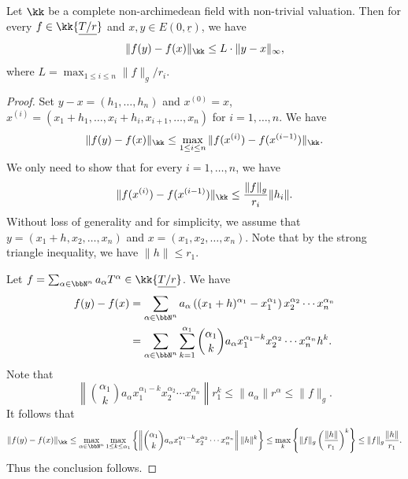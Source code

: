         \begin{proposition}\label{prop:analytic_function_is_lipschitz}
        Let \(\kk\) be a complete non-archimedean field with non-trivial valuation.
        Then for every \(f \in \kk\{ \underline{T/r} \} \) and \(x,y \in E(0,\underline{r})\), we have
        \[ \|f(y) - f(x)\|_\kk \leq L \cdot \|y - x\|_{\infty}, \]
        where \(L = \max_{1 \leq i \leq n} \|f\|_g/r_i\).
    \end{proposition}
    \begin{proof}
        Set \(y - x = (h_1, \ldots, h_n)\) and \(x^{(0)} = x\), \(x^{(i)} = (x_1 + h_1, \ldots, x_i + h_i, x_{i+1}, \ldots, x_n)\) for \(i = 1, \ldots, n\).
        We have
        \[ \|f(y) - f(x)\|_\kk \leq \max_{1 \leq i \leq n} \|f(x^{(i)}) - f(x^{(i-1)})\|_\kk. \]
        We only need to show that for every \(i = 1, \ldots, n\), we have
        \[ \|f(x^{(i)}) - f(x^{(i-1)})\|_\kk \leq \frac{\|f\|_g}{r_i} \|h_i\|. \]
        Without loss of generality and for simplicity, we assume that \(y = (x_1 + h, x_2, \ldots, x_n)\) and \(x = (x_1, x_2, \ldots, x_n)\).
        Note that by the strong triangle inequality, we have \(\|h\| \leq r_1\).

        Let \(f = \sum_{\alpha \in \bbN^n} a_\alpha T^\alpha \in \kk\{ \underline{T/r} \} \).
        We have
        \begin{align*}
            f(y) - f(x) &= \sum_{\alpha \in \bbN^n} a_\alpha \left( (x_1 + h)^{\alpha_1} - x_1^{\alpha_1} \right) x_2^{\alpha_2} \cdots x_n^{\alpha_n} \\
            &= \sum_{\alpha \in \bbN^n}\sum_{k=1}^{\alpha_1} \binom{\alpha_1}{k} a_\alpha x_1^{\alpha_1 - k} x_2^{\alpha_2} \cdots x_n^{\alpha_n}h^k.
        \end{align*}
        Note that
        \[ \left\|\binom{\alpha_1}{k} a_\alpha x_1^{\alpha_1 - k} x_2^{\alpha_2} \cdots x_n^{\alpha_n} \right\| r_1^{k} \leq \|a_\alpha\| r^\alpha \leq \|f\|_g. \]
        It follows that
        \[ \|f(y) - f(x)\|_\kk \leq \max_{\alpha \in \bbN^n} \max_{1 \leq k \leq \alpha_1} \left\{ \left\|\binom{\alpha_1}{k} a_\alpha x_1^{\alpha_1 - k} x_2^{\alpha_2} \cdots x_n^{\alpha_n} \right\| \|h\|^k \right\} \leq \max_{k}\left\{\|f\|_g \left(\frac{\|h\|}{r_1}\right)^k\right\} \leq \|f\|_g \frac{\|h\|}{r_1}. \]
        Thus the conclusion follows.
    \end{proof}

